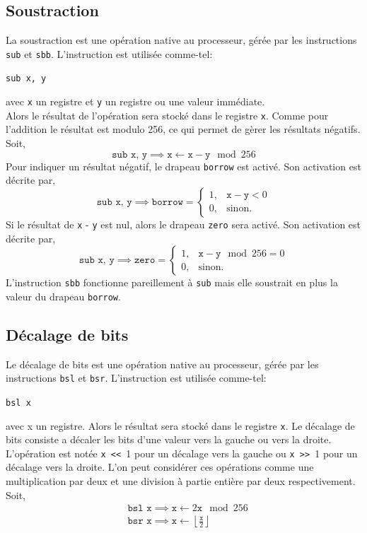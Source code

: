 \documentclass{article}
\begin{document}
\subsection{Soustraction}
La soustraction est une opération native au processeur, gérée par les instructions \texttt{sub} et \texttt{sbb}. L'instruction est utilisée comme-tel:
\begin{center}
\texttt{sub x, y}
\end{center}
avec \texttt{x} un registre et \texttt{y} un registre ou une valeur immédiate.\\
Alors le résultat de l'opération sera stocké dans le registre \texttt{x}. Comme pour l'addition le résultat est modulo 256, ce qui permet de gèrer les résultats négatifs. Soit,
$$\texttt{sub x, y} \implies \texttt{x} \leftarrow \texttt{x} - \texttt{y} \mod 256$$
Pour indiquer un résultat négatif, le drapeau \texttt{borrow} est activé. Son activation est décrite par,
$$\texttt{sub x, y} \implies \texttt{borrow} = \begin{cases}
1, & \texttt{x} - \texttt{y} < 0\\
0, & \text{sinon.}
\end{cases}$$
Si le résultat de \texttt{x} - \texttt{y} est nul, alors le drapeau \texttt{zero} sera activé. Son activation est décrite par,
$$\texttt{sub x, y} \implies \texttt{zero} = \begin{cases}
1, & \texttt{x} - \texttt{y}\mod 256= 0\\
0, & \text{sinon.}
\end{cases}$$
L'instruction \texttt{sbb} fonctionne pareillement à \texttt{sub} mais elle soustrait en plus la valeur du drapeau \texttt{borrow}.
\subsection{Décalage de bits}
Le décalage de bits est une opération native au processeur, gérée par les instructions \texttt{bsl} et \texttt{bsr}. L'instruction est utilisée comme-tel:
\begin{center}
\texttt{bsl x}
\end{center}
avec x un registre.
Alors le résultat sera stocké dans le registre \texttt{x}. Le décalage de bits consiste a décaler les bits d'une valeur vers la gauche ou vers la droite.
L'opération est notée \texttt{x}\verb| << |1 pour un décalage vers la gauche ou \texttt{x}\verb| >> |1 pour un décalage vers la droite.
L'on peut considérer ces opérations comme une multiplication par deux et une division à partie entière par deux respectivement. Soit, 
\begin{align*}
&\texttt{bsl x} \implies \texttt{x} \leftarrow2\texttt{x}\mod 256\\
&\texttt{bsr x} \implies \texttt{x} \leftarrow \left\lfloor\frac{\texttt{x}}{2}\right\rfloor
\end{align*}
\end{document}

